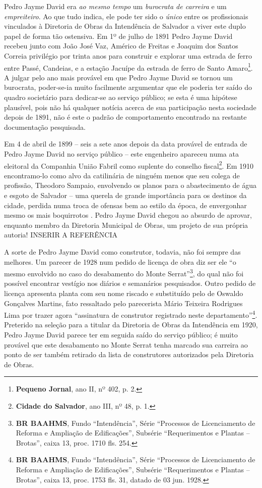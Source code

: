 Pedro Jayme David era \textit{ao mesmo tempo} um \textit{burocrata de carreira} e um \textit{empreiteiro}. Ao que tudo indica, ele pode ter sido o \textit{único} entre os profissionais vinculados à Diretoria de Obras da Intendência de Salvador a viver este duplo papel de forma tão ostensiva. Em 1º de julho de 1891 Pedro Jayme David recebeu junto com João José Vaz, Américo de Freitas e Joaquim dos Santos Correia privilégio por trinta anos para construir e explorar uma estrada de ferro entre Passé, Candeias, e a estação Jacuípe da estrada de ferro de Santo Amaro\footnote{\textbf{Pequeno Jornal}, ano II, nº 402, p. 2.}. A julgar pelo ano mais provável em que Pedro Jayme David se tornou um burocrata, poder-se-ia muito facilmente argumentar que ele poderia ter saído do quadro societário para dedicar-se ao serviço público; se esta é uma hipótese plausível, pois não há qualquer notícia acerca de sua participação nesta sociedade depois de 1891, não é este o padrão de comportamento encontrado na restante documentação pesquisada. 

Em 4 de abril de 1899 -- seis a sete anos depois da data provável de entrada de Pedro Jayme David no serviço público -- este engenheiro apareceu numa ata eleitoral da Companhia União Fabril como suplente do conselho fiscal\footnote{\textbf{Cidade do Salvador}, ano III, nº 48, p. 1.}. Em 1910 encontramo-lo como alvo da catilinária de ninguém menos que seu colega de profissão, Theodoro Sampaio, envolvendo os planos para o abastecimento de água e esgoto de Salvador – uma querela de grande importância para os destinos da cidade, perdida numa troca de ofensas bem ao estilo da época, de envergonhar mesmo os mais boquirrotos \cite{sampaio_agua_1910}. Pedro
Jayme David chegou ao absurdo de aprovar, enquanto membro da Diretoria Municipal de Obras, um projeto de sua própria autoria! INSERIR A REFERÊNCIA

A sorte de Pedro Jayme David como construtor, todavia, não foi sempre das melhores. Um parecer de 1928 num pedido de licença de obra diz ser ele ``o mesmo envolvido no caso do desabamento do Monte Serrat''\footnote{\textbf{BR BAAHMS}, Fundo ``Intendência'', Série ``Processos de Licenciamento de Reforma e Ampliação de Edificações'', Subsérie ``Requerimentos e Plantas – Brotas'', caixa 13, proc. 1710 fls. 254.}, do qual não foi possível encontrar vestígio nos diários e semanários pesquisados. Outro pedido de licença apresenta planta com seu nome riscado e substituído pelo de Oswaldo Gonçalves Martins, fato ressaltado pelo parecerista Mário Teixeira Rodrigues Lima por trazer agora ``assinatura de construtor registrado neste departamento''\footnote{\textbf{BR BAAHMS}, Fundo ``Intendência'', Série ``Processos de Licenciamento de Reforma e Ampliação de Edificações'', Subsérie ``Requerimentos e Plantas – Brotas'', caixa 13, proc. 1753 fls. 31, datado de 03 jun. 1928.}. Preterido na seleção para a titular da Diretoria de Obras da Intendência em 1920, Pedro Jayme David parece ter em seguida saído do serviço público; é muito provável que este desabamento no Monte Serrat tenha marcado sua carreira ao ponto de ser também retirado da lista de construtores autorizados pela Diretoria de Obras.

